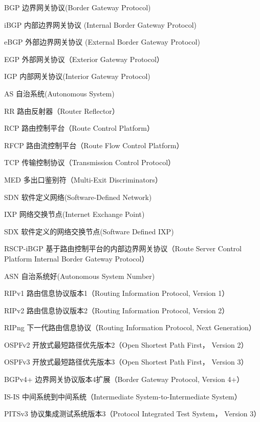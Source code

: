 \begin{denotation}[3cm]
\item[BGP] 边界网关协议(Border Gateway Protocol)
\item[iBGP] 内部边界网关协议 (Internal Border Gateway Protocol)
\item[eBGP] 外部边界网关协议 (External Border Gateway Protocol)
\item[EGP] 外部网关协议（Exterior Gateway Protocol）
\item[IGP] 内部网关协议(Interior Gateway Protocol)
\item[AS] 自治系统(Autonomous System)
\item[RR] 路由反射器（Router Reflector）
\item[RCP] 路由控制平台（Route Control Platform）
\item[RFCP] 路由流控制平台（Route Flow Control Platform）
\item[TCP] 传输控制协议（Transmission Control Protocol）
\item[MED] 多出口鉴别符（Multi-Exit Discriminators）
\item[SDN] 软件定义网络(Software-Defined Network)
\item[IXP] 网络交换节点(Internet Exchange Point)
\item[SDX] 软件定义的网络交换节点(Software Defined IXP)
\item[RSCP-iBGP] 基于路由控制平台的内部边界网关协议（Route Server Control Platform Internal Border Gateway Protocol）
\item[ASN] 自治系统好(Autonomous System Number)
\item[RIPv1] 路由信息协议版本1（Routing Information Protocol, Version 1）
\item[RIPv2] 路由信息协议版本2（Routing Information Protocol, Version 2）
\item[RIPng] 下一代路由信息协议（Routing Information Protocol, Next Generation）
\item[OSPFv2] 开放式最短路径优先版本2（Open Shortest Path First， Version 2）
\item[OSPFv3] 开放式最短路径优先版本3（Open Shortest Path First， Version 3）
\item[BGPv4+] 边界网关协议版本4扩展（Border Gateway Protocol, Version 4+）
\item[IS-IS] 中间系统到中间系统（Intermediate System-to-Intermediate System）
\item[PITSv3] 协议集成测试系统版本3（Protocol Integrated Test System， Version 3）
\end{denotation}
